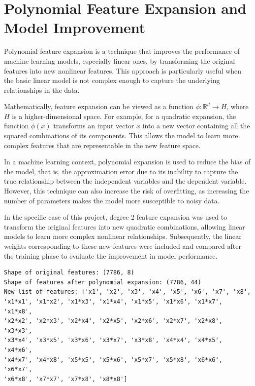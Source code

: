 \documentclass[a4paper, 10pt]{article}
\begin{document}
\newpage
\section{Polynomial Feature Expansion and Model Improvement}
Polynomial feature expansion is a technique that improves the performance of machine learning models, especially linear ones, by transforming the original features into new nonlinear features. This approach is particularly useful when the basic linear model is not complex enough to capture the underlying relationships in the data.

\vspace{0.5cm}
Mathematically, feature expansion can be viewed as a function \(\phi: \mathbb{R}^d \rightarrow H\), where \(H\) is a higher-dimensional space. For example, for a quadratic expansion, the function \(\phi(x)\) transforms an input vector \(x\) into a new vector containing all the squared combinations of its components. This allows the model to learn more complex features that are representable in the new feature space.

\vspace{0.5cm}
In a machine learning context, polynomial expansion is used to reduce the bias of the model, that is, the approximation error due to its inability to capture the true relationship between the independent variables and the dependent variable. However, this technique can also increase the risk of overfitting, as increasing the number of parameters makes the model more susceptible to noisy data.

\vspace{0.5cm}
In the specific case of this project, degree 2 feature expansion was used to transform the original features into new quadratic combinations, allowing linear models to learn more complex nonlinear relationships. Subsequently, the linear weights corresponding to these new features were included and compared after the training phase to evaluate the improvement in model performance.

\begin{verbatim}
Shape of original features: (7786, 8)
Shape of features after polynomial expansion: (7786, 44)
New list of features: ['x1', 'x2', 'x3', 'x4', 'x5', 'x6', 'x7', 'x8',
'x1*x1', 'x1*x2', 'x1*x3', 'x1*x4', 'x1*x5', 'x1*x6', 'x1*x7', 'x1*x8',
'x2*x2', 'x2*x3', 'x2*x4', 'x2*x5', 'x2*x6', 'x2*x7', 'x2*x8', 'x3*x3',
'x3*x4', 'x3*x5', 'x3*x6', 'x3*x7', 'x3*x8', 'x4*x4', 'x4*x5', 'x4*x6',
'x4*x7', 'x4*x8', 'x5*x5', 'x5*x6', 'x5*x7', 'x5*x8', 'x6*x6', 'x6*x7',
'x6*x8', 'x7*x7', 'x7*x8', 'x8*x8']
\end{verbatim}
\end{document}
